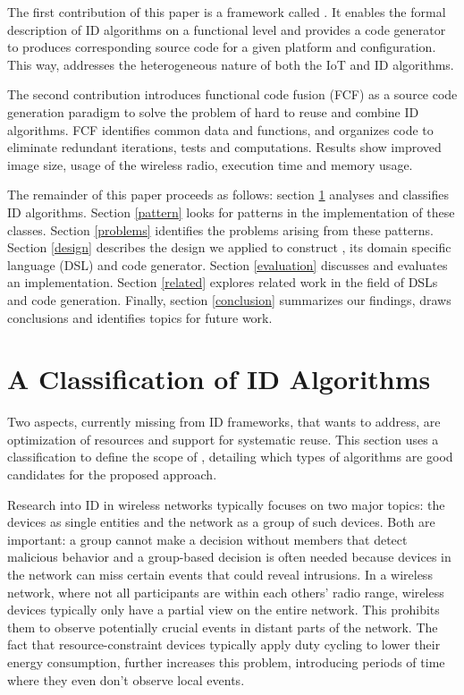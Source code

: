 \documentclass[conference]{IEEEtran}
\begin{document}


The first contribution of this paper is a framework called \NAME. It enables
the formal description of ID algorithms on a functional level and provides a
code generator to produces corresponding source code for a given platform and
configuration. This way, \NAME addresses the heterogeneous nature of both the
IoT and ID algorithms.


The second contribution introduces functional code fusion (FCF) as a source
code generation paradigm to solve the problem of hard to reuse and combine ID
algorithms. FCF identifies common data and functions, and organizes code to
eliminate redundant iterations, tests and computations. Results show improved
image size, usage of the wireless radio, execution time and memory usage.


The remainder of this paper proceeds as follows: section \ref{classification}
analyses and classifies ID algorithms. Section \ref{pattern} looks for patterns
in the implementation of these classes. Section \ref{problems} identifies the
problems arising from these patterns. Section \ref{design} describes the design
we applied to construct \NAME, its domain specific language (DSL) and code
generator. Section \ref{evaluation} discusses and evaluates an implementation.
Section \ref{related} explores related work in the field of DSLs and code
generation. Finally, section \ref{conclusion} summarizes our findings, draws
conclusions and identifies topics for future work.

\section{A Classification of ID Algorithms}
\label{classification}

Two aspects, currently missing from ID frameworks, that \NAME wants to address,
are optimization of resources and support for systematic reuse. This section
uses a classification to define the scope of \NAME, detailing which types of
algorithms are good candidates for the proposed approach.

Research into ID in wireless networks typically focuses on two major topics:
the devices as single entities and the network as a group of such devices. Both
are important: a group cannot make a decision without members that detect
malicious behavior and a group-based decision is often needed because devices
in the network can miss certain events that could reveal intrusions. In a
wireless network, where not all participants are within each others' radio
range, wireless devices typically only have a partial view on the entire
network. This prohibits them to observe potentially crucial events in distant
parts of the network. The fact that resource-constraint devices typically apply
duty cycling to lower their energy consumption, further increases this problem,
introducing periods of time where they even don't observe local events.
\end{document}
